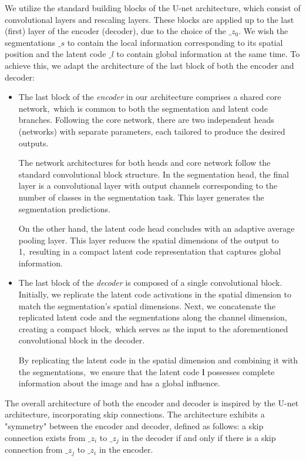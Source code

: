 We utilize the standard building blocks of the U-net architecture, which consist of convolutional layers and rescaling layers.
These blocks are applied up to the last (first) layer of the encoder (decoder), due to the choice of the $\_z_0$. 
We wish the segmentations $\_s$ to contain the local information corresponding to its spatial position and the latent code $\_l$ to
contain global information at the same time.  To achieve this, we adapt the architecture of the last block of both the encoder and decoder:

\begin{itemize}
    \item The last block of the \textit{encoder} in our architecture comprises a shared core network,~which 
    is common to both the segmentation and latent code branches. Following the core network, there 
    are two independent heads (networks) with separate parameters, each tailored to produce the 
    desired outputs.

    The network architectures for both heads and core network follow the standard convolutional block structure. 
    In the segmentation head, the final layer is a convolutional layer with output channels corresponding 
    to the number of classes in the segmentation task. This layer generates the segmentation predictions.
    
    On the other hand, the latent code head concludes with an adaptive average pooling layer. This layer
    reduces the spatial dimensions of the output to 1,~resulting in a compact latent code representation
    that captures global information.
   

    \item The last block of the \textit{decoder} is composed of a single convolutional block. Initially, we replicate the latent
    code activations in the spatial dimension to match the segmentation's spatial dimensions. Next, we concatenate
    the replicated latent code and the segmentations along the channel dimension, creating a compact block,~which 
    serves as the input to the aforementioned convolutional block in the decoder.

    By replicating the latent code in the spatial dimension and combining it with the segmentations,~we ensure that the
    latent code $\mathbf{l}$ possesses complete information about the image and has a global influence. 
\end{itemize}

The overall architecture of both the encoder and decoder is inspired by the U-net architecture, incorporating skip connections. 
The architecture exhibits a "symmetry" between the encoder and decoder, defined as follows: a skip connection exists from $\_z_i$ to $\_z_j$ in
the decoder if and only if there is a skip connection from $\_z_j$ to $\_z_i$ in the encoder. 

